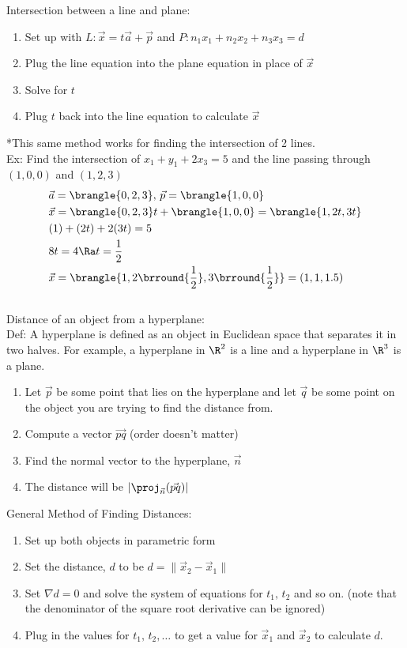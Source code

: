 Intersection between a line and plane:
\begin{enumerate}
    \item Set up with $L:\vec{x}=t\vec{a}+\vec{p}$ and $P:n_1x_1+n_2x_2+n_3x_3=d$
    \item Plug the line equation into the plane equation in place of $\vec{x}$
    \item Solve for $t$
    \item Plug $t$ back into the line equation to calculate $\vec{x}$
\end{enumerate}
*This same method works for finding the intersection of 2 lines.\\
Ex: Find the intersection of $x_1+y_1+2x_3=5$ and the line passing through $(1,0,0)$ and $(1,2,3)$
\begin{align*}
    &\vec{a}=\brangle{0,2,3},\,\vec{p}=\brangle{1,0,0}\\
    &\vec{x}=\brangle{0,2,3}t+\brangle{1,0,0}=\brangle{1,2t,3t}\\
    &(1)+(2t)+2(3t)=5\\
    &8t=4\Ra t=\frac{1}{2}\\
    &\vec{x}=\brangle{1,2\brround{\frac{1}{2}},3\brround{\frac{1}{2}}}=(1,1,1.5)
\end{align*}
\\
Distance of an object from a hyperplane:\\
Def: A hyperplane is defined as an object in Euclidean space that separates it in two halves. For example, a hyperplane in $\R^2$ is a line and a hyperplane in $\R^3$ is a plane.\\
\begin{enumerate}
    \item Let $\vec{p}$ be some point that lies on the hyperplane and let $\vec{q}$ be some point on the object you are trying to find the distance from.
    \item Compute a vector $\vec{pq}$ (order doesn't matter)
    \item Find the normal vector to the hyperplane, $\vec{n}$
    \item The distance will be $|\proj_{\vec{n}}(\vec{pq})|$
\end{enumerate}
General Method of Finding Distances:
\begin{enumerate}
    \item Set up both objects in parametric form
    \item Set the distance, $d$ to be $d=\|\vec{x}_2-\vec{x}_1\|$
    \item Set $\nabla d=0$ and solve the system of equations for $t_1,\,t_2$ and so on. (note that the denominator of the square root derivative can be ignored)
    \item Plug in the values for $t_1,\,t_2,\ldots$ to get a value for $\vec{x}_1$ and $\vec{x}_2$ to calculate $d$.
\end{enumerate}